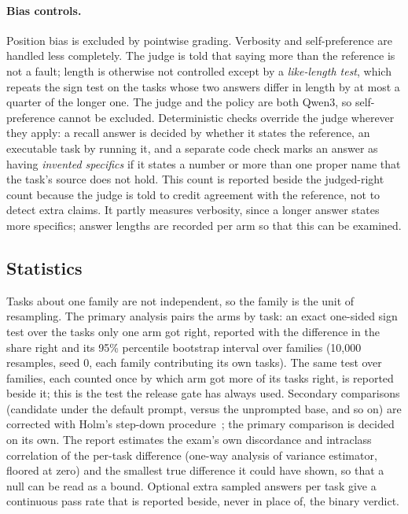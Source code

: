 \paragraph{Bias controls.}
Position bias is excluded by pointwise grading. Verbosity and self-preference
\citep{zheng2023judging,dubois2024lc} are handled less completely. The judge is told that
saying more than the reference is not a fault; length is otherwise not controlled except by
a \emph{like-length test}, which repeats the sign test on the tasks whose two answers differ
in length by at most a quarter of the longer one. The judge and the policy are both Qwen3, so
self-preference cannot be excluded. Deterministic checks override the judge wherever they apply: a recall
answer is decided by whether it states the reference, an executable task by running it, and
a separate code check marks an answer as having \emph{invented specifics} if it states a
number or more than one proper name that the task's source does not hold. This count is
reported beside the judged-right count because the judge is told to credit agreement with
the reference, not to detect extra claims. It partly measures verbosity, since a longer
answer states more specifics; answer lengths are recorded per arm so that this can be
examined.

\subsection{Statistics}

Tasks about one family are not independent, so the family is the unit of resampling. The
primary analysis pairs the arms by task: an exact one-sided sign test over the tasks only
one arm got right, reported with the difference in the share right and its 95\% percentile
bootstrap interval over families (10,000 resamples, seed 0, each family contributing its own
tasks). The same test over families, each counted once by which arm got more of its tasks
right, is reported beside it; this is the test the release gate has always used. Secondary
comparisons (candidate under the default prompt, versus the unprompted base, and so on)
are corrected with Holm's step-down procedure~\citep{holm1979}; the primary comparison is
decided on its own. The report estimates the exam's own discordance and intraclass
correlation of the per-task difference (one-way analysis of variance estimator, floored at
zero) and the smallest true difference it could have shown, so that a null can be read as a
bound. Optional extra sampled answers per task give a continuous pass rate that is reported
beside, never in place of, the binary verdict.

